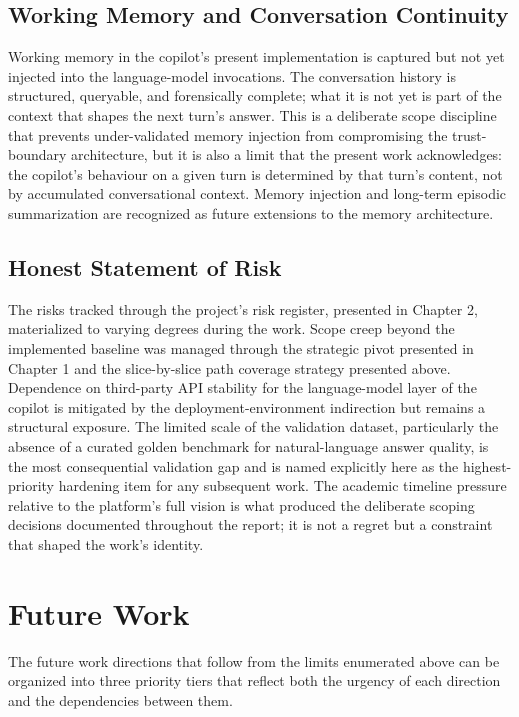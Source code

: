 \subsection*{Working Memory and Conversation Continuity}
Working memory in the copilot's present implementation is captured but not yet injected into the language-model invocations. The conversation history is structured, queryable, and forensically complete; what it is not yet is part of the context that shapes the next turn's answer. This is a deliberate scope discipline that prevents under-validated memory injection from compromising the trust-boundary architecture, but it is also a limit that the present work acknowledges: the copilot's behaviour on a given turn is determined by that turn's content, not by accumulated conversational context. Memory injection and long-term episodic summarization are recognized as future extensions to the memory architecture.

\subsection*{Honest Statement of Risk}
The risks tracked through the project's risk register, presented in Chapter 2, materialized to varying degrees during the work. Scope creep beyond the implemented baseline was managed through the strategic pivot presented in Chapter 1 and the slice-by-slice path coverage strategy presented above. Dependence on third-party API stability for the language-model layer of the copilot is mitigated by the deployment-environment indirection but remains a structural exposure. The limited scale of the validation dataset, particularly the absence of a curated golden benchmark for natural-language answer quality, is the most consequential validation gap and is named explicitly here as the highest-priority hardening item for any subsequent work. The academic timeline pressure relative to the platform's full vision is what produced the deliberate scoping decisions documented throughout the report; it is not a regret but a constraint that shaped the work's identity.

\section{Future Work}
The future work directions that follow from the limits enumerated above can be organized into three priority tiers that reflect both the urgency of each direction and the dependencies between them.

